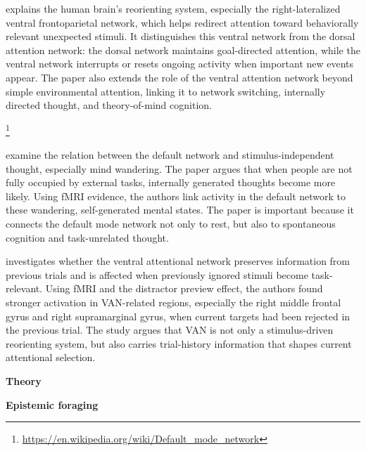 \documentclass{book}
\providecommand{\ProjectDeepHeading}[2]{%
    \par\medskip\noindent\textbf{#2}\par\smallskip
}
\providecommand{\seeherefooter}[1]{\footnote{\url{#1}}}
\begin{document}
    \cite{corbetta-2008-the-reorienting-system-of-the-human-brain-from-environment-to-theory-of-mind} explains the human brain’s reorienting system, especially the right-lateralized ventral frontoparietal network, which helps redirect attention toward behaviorally relevant unexpected stimuli. It distinguishes this ventral network from the dorsal attention network: the dorsal network maintains goal-directed attention, while the ventral network interrupts or resets ongoing activity when important new events appear. The paper also extends the role of the ventral attention network beyond simple environmental attention, linking it to network switching, internally directed thought, and theory-of-mind cognition.


\seeherefooter{https://en.wikipedia.org/wiki/Default_mode_network}

    \cite{mason-2007-wandering-minds-the-default-network-and-stimulus-independent-thought} examine the relation between the default network and stimulus-independent thought, especially mind wandering. The paper argues that when people are not fully occupied by external tasks, internally generated thoughts become more likely. Using fMRI evidence, the authors link activity in the default network to these wandering, self-generated mental states. The paper is important because it connects the default mode network not only to rest, but also to spontaneous cognition and task-unrelated thought.


\cite{scalf-2014-trial-history-effects-in-the-ventral-attentional-network}  investigates whether the ventral attentional network preserves information from previous trials and is affected when previously ignored stimuli become task-relevant. Using fMRI and the distractor preview effect, the authors found stronger activation in VAN-related regions, especially the right middle frontal gyrus and right supramarginal gyrus, when current targets had been rejected in the previous trial. The study argues that VAN is not only a stimulus-driven reorienting system, but also carries trial-history information that shapes current attentional selection.

\ProjectDeepHeading{3}{Theory}

\ProjectDeepHeading{4}{Epistemic foraging}
\end{document}
